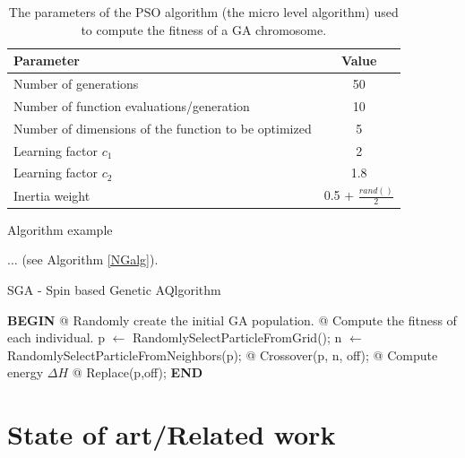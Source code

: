 \documentclass[runningheads,a4paper,11pt]{report}
\begin{document}
\begin{table}[htbp]
	\caption{The parameters of the PSO algorithm (the micro level algorithm) used to compute the fitness of a GA chromosome.}
	\label{tab3PSO}
		\begin{center}
			\begin{tabular}{p{220pt}c}

				\textbf{Parameter}& \textbf{Value} \\
				\hline\hline
 				Number of generations& 50 \\
 				Number of function evaluations/generation& 10 \\
 				Number of dimensions of the function to be optimized& 5 \\
 				Learning factor $c_{1}$& 2 \\
 				Learning factor $c_{2}$ & 1.8\\
 				Inertia weight& 0.5 + $\frac{rand()}{2}$\\
		
			\end{tabular}
		\end{center}
\end{table}

Algorithm example 

$\ldots$ (see Algorithm \ref{NGalg}).



\begin{algorithm}
	\caption{SGA - Spin based Genetic AQlgorithm}
	\label{NGalg}
		\begin{algorithmic}


			\STATE \textbf{BEGIN}
  		\STATE @ Randomly create the initial GA population.
  		\STATE @ Compute the fitness of each individual.
  				\STATE p $\leftarrow$ RandomlySelectParticleFromGrid();
  				\STATE n $\leftarrow$ RandomlySelectParticleFromNeighbors(p);
  				\STATE @ Crossover(p, n, off);
  				\STATE @ Compute energy $\Delta H$
  					\STATE @ Replace(p,off);
  				\ENDIF
  			\ENDFOR
  		\ENDFOR
  		\STATE \textbf{END}
\end{algorithmic}
\end{algorithm}


\chapter{State of art/Related work}
\label{chapter:stateOfArt}
\end{document}

